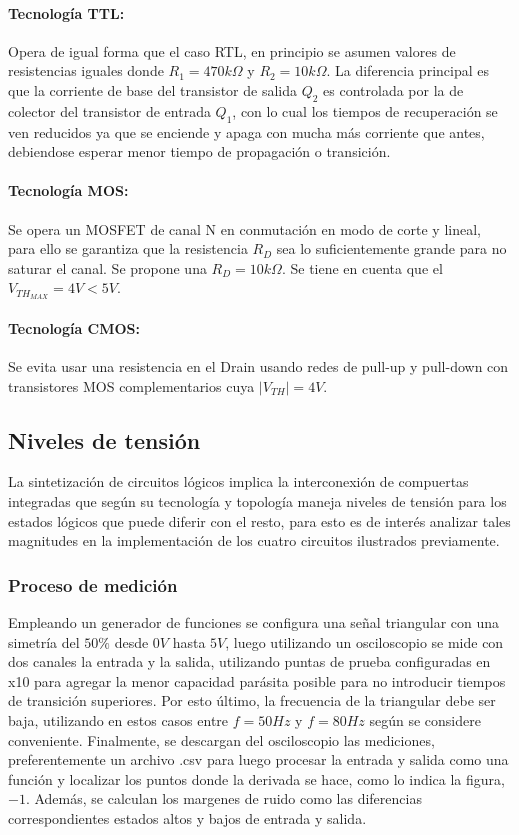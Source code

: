 \paragraph*{Tecnolog\'ia TTL:} Opera de igual forma que el caso RTL, en principio se asumen valores de resistencias iguales donde $R_1 = 470 k \Omega$ y $R_2 = 10k \Omega$. La diferencia principal es que la corriente de base del transistor de salida $Q_2$ es controlada por la de colector
del transistor de entrada $Q_1$, con lo cual los tiempos de recuperaci\'on se ven reducidos ya que se enciende y apaga con mucha m\'as corriente que antes, debiendose esperar menor tiempo de propagaci\'on o transici\'on.
\paragraph*{Tecnolog\'ia MOS:} Se opera un MOSFET de canal N en conmutaci\'on en modo de corte y lineal, para ello se garantiza que la resistencia $R_D$ sea lo suficientemente grande para no saturar el canal. Se propone una $R_D = 10k \Omega$. Se tiene en cuenta que el $V_{TH_{MAX}} = 4V < 5V$.
\paragraph*{Tecnolog\'ia CMOS:} Se evita usar una resistencia en el Drain usando redes de pull-up y pull-down con transistores MOS complementarios cuya $|V_{TH}| = 4V$.

\subsection{Niveles de tensi\'on}
La sintetizaci\'on de circuitos l\'ogicos implica la interconexi\'on de compuertas integradas que seg\'un su tecnolog\'ia y topolog\'ia maneja niveles de tensi\'on para los estados l\'ogicos que puede diferir con el resto, para esto
es de inter\'es analizar tales magnitudes en la implementaci\'on de los cuatro circuitos ilustrados previamente.

\subsubsection{Proceso de medici\'on}
Empleando un generador de funciones se configura una se\~nal triangular con una simetr\'ia del $50\%$ desde $0V$ hasta $5V$, luego utilizando un osciloscopio
se mide con dos canales la entrada y la salida, utilizando puntas de prueba configuradas en x10 para agregar la menor capacidad par\'asita posible para no introducir tiempos de transici\'on superiores. Por esto \'ultimo,
la frecuencia de la triangular debe ser baja, utilizando en estos casos entre $f = 50Hz$ y $f = 80 Hz$ seg\'un se considere conveniente.
Finalmente, se descargan del osciloscopio las mediciones, preferentemente un archivo .csv para luego procesar la entrada y salida como una funci\'on y localizar los puntos donde la derivada
se hace, como lo indica la figura, $-1$. Adem\'as, se calculan los margenes de ruido como las diferencias correspondientes estados altos y bajos de entrada y salida.

